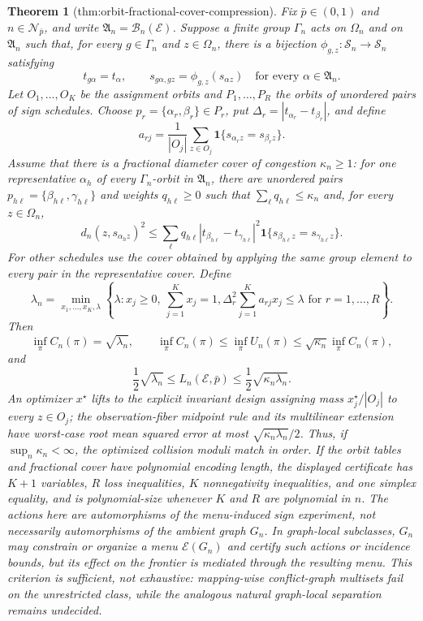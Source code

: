 \documentclass{article}
\newtheorem{theorem}{Theorem}
\begin{document}
\begin{theorem}[thm:orbit-fractional-cover-compression]\label{thm:orbit-fractional-cover-compression}
Fix \(\bar p\in(0,1)\) and \(n\in\mathcal N_{\bar p}\), and write \(\mathfrak A_n=\mathcal B_n(\mathcal E)\). Suppose a finite group \(\Gamma_n\) acts on \(\Omega_n\) and on \(\mathfrak A_n\) such that, for every \(g\in\Gamma_n\) and \(z\in\Omega_n\), there is a bijection \(\phi_{g,z}:\mathcal S_n\to\mathcal S_n\) satisfying
\[
 t_{g\alpha}=t_\alpha,
 \qquad
 s_{g\alpha,gz}=\phi_{g,z}(s_{\alpha z})
 \quad\text{for every }\alpha\in\mathfrak A_n.
\]
Let \(O_1,\ldots,O_K\) be the assignment orbits and \(P_1,\ldots,P_R\) the orbits of unordered pairs of sign schedules. Choose \(p_r=\{\alpha_r,\beta_r\}\in P_r\), put \(\Delta_r=|t_{\alpha_r}-t_{\beta_r}|\), and define
\[
 a_{rj}=\frac{1}{|O_j|}\sum_{z\in O_j}
 \mathbf 1\{s_{\alpha_r z}=s_{\beta_r z}\}.
\]
Assume that there is a fractional diameter cover of congestion \(\kappa_n\ge1\): for one representative \(\alpha_h\) of every \(\Gamma_n\)-orbit in \(\mathfrak A_n\), there are unordered pairs \(p_{h\ell}=\{\beta_{h\ell},\gamma_{h\ell}\}\) and weights \(q_{h\ell}\ge0\) such that \(\sum_\ell q_{h\ell}\le\kappa_n\) and, for every \(z\in\Omega_n\),
\[
 d_n(z,s_{\alpha_h z})^2
 \le
 \sum_\ell q_{h\ell}
 |t_{\beta_{h\ell}}-t_{\gamma_{h\ell}}|^2
 \mathbf 1\{s_{\beta_{h\ell}z}=s_{\gamma_{h\ell}z}\}.
\]
For other schedules use the cover obtained by applying the same group element to every pair in the representative cover. Define
\[
 \lambda_n=\min_{x_1,\ldots,x_K,\lambda}
 \left\{\lambda:
 x_j\ge0,\ \sum_{j=1}^Kx_j=1,
 \Delta_r^2\sum_{j=1}^K a_{rj}x_j\le\lambda
 \text{ for }r=1,\ldots,R\right\}.
\]
Then
\[
 \inf_\pi C_n(\pi)=\sqrt{\lambda_n},
 \qquad
 \inf_\pi C_n(\pi)
 \le \inf_\pi U_n(\pi)
 \le \sqrt{\kappa_n}\inf_\pi C_n(\pi),
\]
and
\[
 \frac12\sqrt{\lambda_n}
 \le L_n(\mathcal E,\bar p)
 \le \frac12\sqrt{\kappa_n\lambda_n}.
\]
An optimizer \(x^\star\) lifts to the explicit invariant design assigning mass \(x_j^\star/|O_j|\) to every \(z\in O_j\); the observation-fiber midpoint rule and its multilinear extension have worst-case root mean squared error at most \(\sqrt{\kappa_n\lambda_n}/2\). Thus, if \(\sup_n\kappa_n<\infty\), the optimized collision moduli match in order. If the orbit tables and fractional cover have polynomial encoding length, the displayed certificate has \(K+1\) variables, \(R\) loss inequalities, \(K\) nonnegativity inequalities, and one simplex equality, and is polynomial-size whenever \(K\) and \(R\) are polynomial in \(n\). The actions here are automorphisms of the menu-induced sign experiment, not necessarily automorphisms of the ambient graph \(G_n\). In graph-local subclasses, \(G_n\) may constrain or organize a menu \(\mathcal E(G_n)\) and certify such actions or incidence bounds, but its effect on the frontier is mediated through the resulting menu. This criterion is sufficient, not exhaustive: mapping-wise conflict-graph multisets fail on the unrestricted class, while the analogous natural graph-local separation remains undecided.
\end{theorem}
\end{document}

